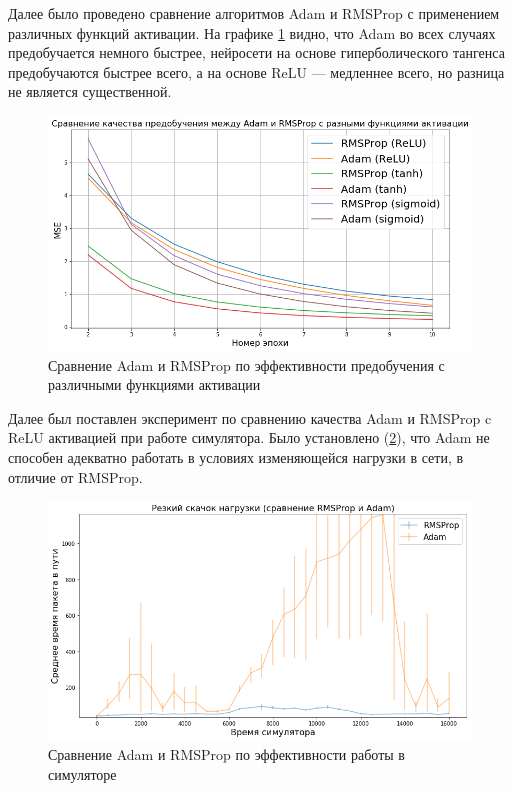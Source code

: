 \documentclass[specification, annotation]{itmo-student-thesis}
\begin{document}
Далее было проведено сравнение алгоритмов Adam и RMSProp с применением различных
функций активации. На графике
\ref{experiment-optimizers-pretrain-adam-vs-rmsprop} видно, что Adam во всех
случаях предобучается немного быстрее, нейросети на основе гиперболического
тангенса предобучаются быстрее всего, а на основе ReLU --- медленнее всего, но
разница не является существенной.

\begin{figure}[!h]
  \caption{Сравнение Adam и RMSProp по эффективности предобучения с различными
    функциями активации}\label{experiment-optimizers-pretrain-adam-vs-rmsprop}
  \centering
  \includegraphics[scale=0.6]{experiment-optimizers-pretrain-adam-vs-rmsprop}
\end{figure}

Далее был поставлен эксперимент по сравнению качества Adam и RMSProp c ReLU
активацией при работе симулятора. Было установлено
(\ref{experiment-adam-failure}), что Adam не способен адекватно работать в
условиях изменяющейся нагрузки в сети, в отличие от RMSProp.

\begin{figure}[!h]
  \caption{Сравнение Adam и RMSProp по эффективности работы в
    симуляторе}\label{experiment-adam-failure}
  \centering
  \includegraphics[scale=0.6]{experiment-adam-failure}
\end{figure}
\end{document}
